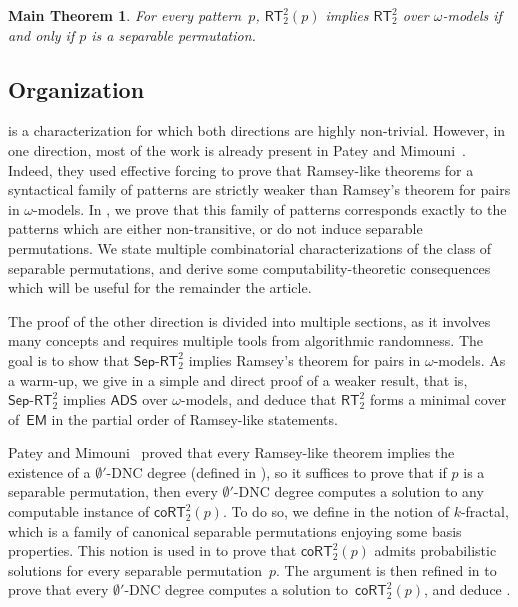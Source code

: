 \documentclass{article}
\numberwithin{theorem}{section}
\newtheorem{maintheorem}[theorem]{Main Theorem}
\newcommand{\ADS}[0]{\mathsf{ADS}}
\newcommand{\EM}[0]{\mathsf{EM}}
\newcommand{\RT}[0]{\mathsf{RT}}
\newcommand{\coRT}[0]{\mathsf{coRT}}
\newcommand{\SepRT}[0]{\mathsf{Sep}\mbox{-}\mathsf{RT}}
\begin{document}
\begin{maintheorem}\label{maintheorem1}
For every pattern~$p$, $\RT^2_2(p)$ implies $\RT^2_2$ over $\omega$-models if and only if $p$ is a separable permutation.
\end{maintheorem}

\subsection{Organization}

 is a characterization for which both directions are highly non-trivial. However, in one direction, most of the work is already present in Patey and Mimouni~\cite{mimouni2025ramseylike}. Indeed, they used effective forcing to prove that Ramsey-like theorems for a syntactical family of patterns are strictly weaker than Ramsey's theorem for pairs in $\omega$-models. In , we prove that this family of patterns corresponds exactly to the patterns which are either non-transitive, or do not induce separable permutations. We state multiple combinatorial characterizations of the class of separable permutations, and derive some computability-theoretic consequences which will be useful for the remainder the article.

The proof of the other direction is divided into multiple sections, as it involves many concepts and requires multiple tools from algorithmic randomness. The goal is to show that $\SepRT^2_2$ implies Ramsey's theorem for pairs in $\omega$-models. As a warm-up, we give in  a simple and direct proof of a weaker result, that is, $\SepRT^2_2$ implies $\ADS$ over $\omega$-models, and deduce that $\RT^2_2$ forms a minimal cover of~$\EM$ in the partial order of Ramsey-like statements.

Patey and Mimouni~\cite{mimouni2025ramseylike} proved that every Ramsey-like theorem implies the existence of a $\emptyset'$-DNC degree (defined in ), so it suffices to prove that if $p$ is a separable permutation, then every $\emptyset'$-DNC degree computes a solution to any computable instance of $\coRT^2_2(p)$. To do so, we define in  the notion of $k$-fractal, which is a family of canonical separable permutations enjoying some basis properties. This notion is used in  to prove that $\coRT^2_2(p)$ admits probabilistic solutions for every separable permutation~$p$. The argument is then refined in  to prove that every $\emptyset'$-DNC degree computes a solution to~$\coRT^2_2(p)$, and deduce .
\end{document}
